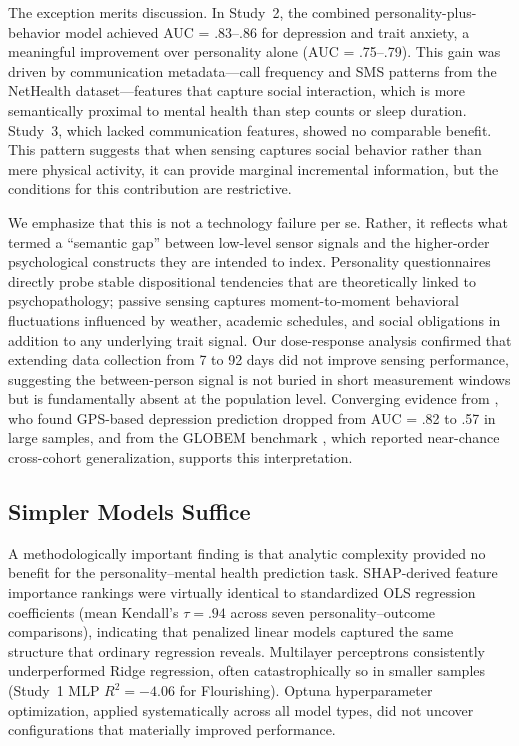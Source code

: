 \documentclass[12pt, a4paper]{article}
\begin{document}
The exception merits discussion. In Study~2, the combined personality-plus-behavior model achieved AUC = .83--.86 for depression and trait anxiety, a meaningful improvement over personality alone (AUC = .75--.79). This gain was driven by communication metadata---call frequency and SMS patterns from the NetHealth dataset---features that capture social interaction, which is more semantically proximal to mental health than step counts or sleep duration. Study~3, which lacked communication features, showed no comparable benefit. This pattern suggests that when sensing captures social behavior rather than mere physical activity, it can provide marginal incremental information, but the conditions for this contribution are restrictive.

We emphasize that this is not a technology failure per se. Rather, it reflects what \citet{dasswain2022semantic} termed a ``semantic gap'' between low-level sensor signals and the higher-order psychological constructs they are intended to index. Personality questionnaires directly probe stable dispositional tendencies that are theoretically linked to psychopathology; passive sensing captures moment-to-moment behavioral fluctuations influenced by weather, academic schedules, and social obligations in addition to any underlying trait signal. Our dose-response analysis confirmed that extending data collection from 7 to 92 days did not improve sensing performance, suggesting the between-person signal is not buried in short measurement windows but is fundamentally absent at the population level. Converging evidence from \citet{muller2021depression}, who found GPS-based depression prediction dropped from AUC = .82 to .57 in large samples, and from the GLOBEM benchmark \citep{xu2022globem}, which reported near-chance cross-cohort generalization, supports this interpretation.

\subsection{Simpler Models Suffice}

A methodologically important finding is that analytic complexity provided no benefit for the personality--mental health prediction task. SHAP-derived feature importance rankings were virtually identical to standardized OLS regression coefficients (mean Kendall's $\tau = .94$ across seven personality--outcome comparisons), indicating that penalized linear models captured the same structure that ordinary regression reveals. Multilayer perceptrons consistently underperformed Ridge regression, often catastrophically so in smaller samples (Study~1 MLP $R^2 = -4.06$ for Flourishing). Optuna hyperparameter optimization, applied systematically across all model types, did not uncover configurations that materially improved performance.
\end{document}
